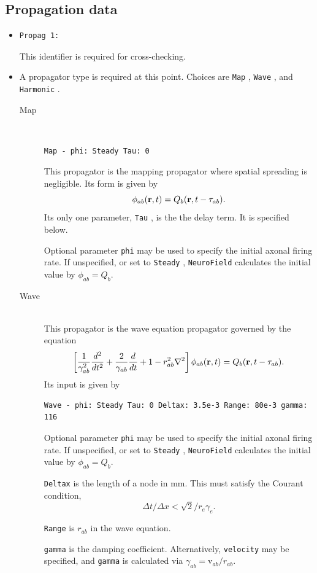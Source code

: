 \documentclass[12pt,a4paper]{article}
\newcommand{\type}[1]{ {\small\small\tt #1} }
\newcommand{\NF}[0]{ \type{NeuroField}}
\begin{document}
\subsection{Propagation data}
\label{sec:prop}
\begin{itemize}
\item
	\begin{lstlisting}
Propag 1:
	\end{lstlisting}
	This identifier is required for cross-checking.
\item A propagator type is required at this point. Choices are \type{Map}, \type{Wave}, and \type{Harmonic}.
\begin{description}
	\item[Map]\ \\
	\begin{lstlisting}
Map - phi: Steady Tau: 0
	\end{lstlisting}
	This propagator is the mapping propagator where spatial spreading is negligible. Its form is given by
	\[\phi_{ab}({\bf r}, t) = Q_b ({\bf r}, t - \tau_{ab}).\]
	Its only one parameter, \type{Tau}, is the the delay term. It is specified below.

	Optional parameter \type{phi} may be used to specify the initial axonal firing rate. If unspecified, or set to \type{Steady}, \NF calculates the initial value by \(\phi_{ab}=Q_{b}\).

	\item[Wave]\ \\
	This propagator is the wave equation propagator governed by the equation
	\[\left[\frac{1}{\gamma_{ab}^2}\frac{d^2}{d t^2}+\frac{2}{\gamma_{ab}}\frac{d} {d t}+1 -r^2_{ab}\nabla^2 \right] \phi_{ab}({\bf r},t) =Q_b({\bf r},t-\tau_{ab}).\]
	Its input is given by
	\begin{lstlisting}
Wave - phi: Steady Tau: 0 Deltax: 3.5e-3 Range: 80e-3 gamma: 116
	\end{lstlisting}

	Optional parameter \type{phi} may be used to specify the initial axonal firing rate. If unspecified, or set to \type{Steady}, \NF calculates the initial value by \(\phi_{ab}=Q_{b}\).

	\type{Deltax} is the length of a node in mm. This must satisfy the Courant condition, \[\Delta t/\Delta x<\sqrt{2}/r_e\gamma_e.\]

	\type{Range} is $r_{ab}$ in the wave equation.
	
	\type{gamma} is the damping coefficient. Alternatively, \type{velocity} may be specified, and \type{gamma} is calculated via \(\gamma_{ab}=\mathrm{v}_{ab}/r_{ab}\).


\end{description}
\end{itemize}
\end{document}
